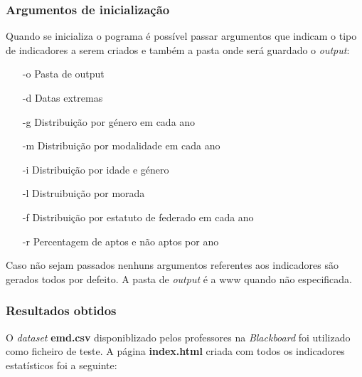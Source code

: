 \subsubsection{Argumentos de inicialização}

Quando se inicializa o pograma é possível passar argumentos que indicam o tipo de 
indicadores a serem criados e também a pasta onde será guardado o \textit{output}:
\begin{itemize}
    \item [-o]{Pasta de output}
    \item [-d]{Datas extremas}
    \item [-g]{Distribuição por género em cada ano}
    \item [-m]{Distribuição por modalidade em cada ano}
    \item [-i]{Distribuição por idade e género}
    \item [-l]{Distruibuição por morada} 
    \item [-f]{Distribuição por estatuto de federado em cada ano}
    \item [-r]{Percentagem de aptos e não aptos por ano}
\end{itemize}

Caso não sejam passados nenhuns argumentos referentes aos indicadores são
gerados todos por defeito. A pasta de \textit{output} é a www quando não
especificada.

\subsubsection{Resultados obtidos}

O \textit{dataset} \textbf{emd.csv} disponiblizado pelos professores na \textit{Blackboard}
foi utilizado como ficheiro de teste. A página \textbf{index.html} criada com todos os indicadores
estatísticos foi a seguinte: